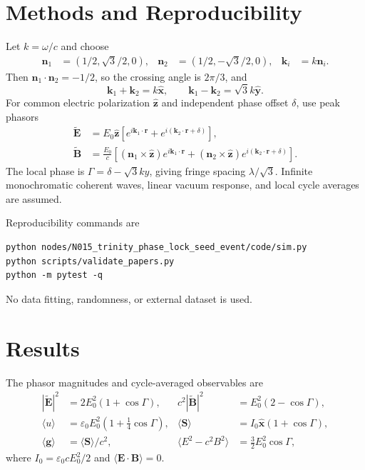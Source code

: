 \documentclass[11pt]{article}
\begin{document}
\section{Methods and Reproducibility}
Let $k=\omega/c$ and choose
\begin{align}
 \mathbf{n}_1&=(1/2,\sqrt{3}/2,0), &
 \mathbf{n}_2&=(1/2,-\sqrt{3}/2,0), &
 \mathbf{k}_i&=k\mathbf{n}_i. \tag{1}
\end{align}
Then $\mathbf{n}_1\cdot\mathbf{n}_2=-1/2$, so the crossing angle is
$2\pi/3$, and
\begin{equation}
 \mathbf{k}_1+\mathbf{k}_2=k\hat{\mathbf{x}},\qquad
 \mathbf{k}_1-\mathbf{k}_2=\sqrt{3}k\hat{\mathbf{y}}. \tag{2}
\end{equation}
For common electric polarization $\hat{\mathbf{z}}$ and independent phase offset
$\delta$, use peak phasors
\begin{align}
 \widetilde{\mathbf E}&=E_0\hat{\mathbf z}
 \left[e^{i\mathbf{k}_1\cdot\mathbf r}+e^{i(\mathbf{k}_2\cdot\mathbf r+\delta)}\right], \tag{3}\\
 \widetilde{\mathbf B}&=\frac{E_0}{c}\left[(\mathbf n_1\times\hat{\mathbf z})e^{i\mathbf{k}_1\cdot\mathbf r}
 +(\mathbf n_2\times\hat{\mathbf z})e^{i(\mathbf{k}_2\cdot\mathbf r+\delta)}\right]. \tag{4}
\end{align}
The local phase is $\Gamma=\delta-\sqrt{3}ky$, giving fringe spacing
$\lambda/\sqrt{3}$. Infinite monochromatic coherent waves, linear vacuum response,
and local cycle averages are assumed.

Reproducibility commands are
\begin{verbatim}
python nodes/N015_trinity_phase_lock_seed_event/code/sim.py
python scripts/validate_papers.py
python -m pytest -q
\end{verbatim}
No data fitting, randomness, or external dataset is used.

\section{Results}
The phasor magnitudes and cycle-averaged observables are
\begin{align}
 |\widetilde{\mathbf E}|^2&=2E_0^2(1+\cos\Gamma), &
 c^2|\widetilde{\mathbf B}|^2&=E_0^2(2-\cos\Gamma), \tag{5}\\
 \langle u\rangle&=\varepsilon_0E_0^2(1+\tfrac14\cos\Gamma), &
 \langle\mathbf S\rangle&=I_0\hat{\mathbf x}(1+\cos\Gamma), \tag{6}\\
 \langle\mathbf g\rangle&=\langle\mathbf S\rangle/c^2, &
 \langle E^2-c^2B^2\rangle&=\tfrac32E_0^2\cos\Gamma, \tag{7}
\end{align}
where $I_0=\varepsilon_0cE_0^2/2$ and
$\langle\mathbf E\cdot\mathbf B\rangle=0$.
\end{document}
